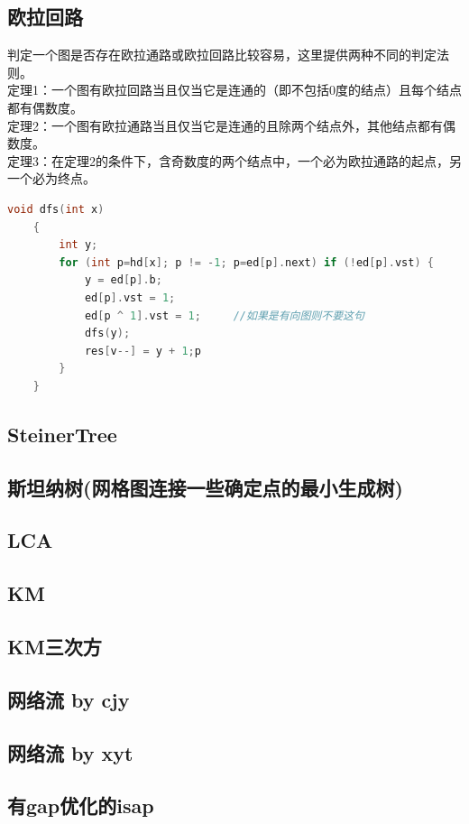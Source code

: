 \documentclass[landscape,a4paper]{article}
\begin{document}
\begin{spacing}{0.3}
\begin{multicols}{2}
\subsection{欧拉回路}
判定一个图是否存在欧拉通路或欧拉回路比较容易，这里提供两种不同的判定法则。\\
定理1：一个图有欧拉回路当且仅当它是连通的（即不包括0度的结点）且每个结点都有偶数度。\\
定理2：一个图有欧拉通路当且仅当它是连通的且除两个结点外，其他结点都有偶数度。 \\
定理3：在定理2的条件下，含奇数度的两个结点中，一个必为欧拉通路的起点，另一个必为终点。
\begin{lstlisting}[language=C++]
	void dfs(int x)
	{
    	int y;
   	 	for (int p=hd[x]; p != -1; p=ed[p].next) if (!ed[p].vst) {
       	 	y = ed[p].b;
        	ed[p].vst = 1;
        	ed[p ^ 1].vst = 1;     //如果是有向图则不要这句
        	dfs(y);
        	res[v--] = y + 1;p
    	}
	}
\end{lstlisting}
		\subsection{SteinerTree}
		  \subsection{斯坦纳树(网格图连接一些确定点的最小生成树)}
		
		\subsection{LCA}
		
		\subsection{KM}
		
		\subsection{KM三次方}
		
		\subsection{网络流 by cjy}
		
		\subsection{网络流 by xyt}
		
		\subsection{有gap优化的isap}
		

\end{multicols}
\end{spacing}
\end{document}
